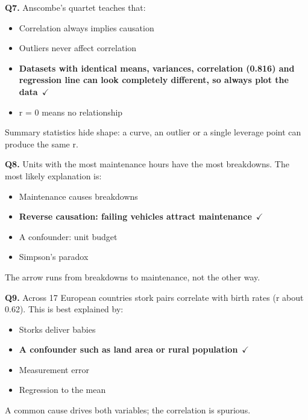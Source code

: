 \documentclass[11pt]{article}
\begin{document}
{\noindent\textbf{Q7.} Anscombe's quartet teaches that:\begin{itemize}[leftmargin=2.2em,itemsep=0pt,topsep=1pt]\item[A.] Correlation always implies causation\item[B.] Outliers never affect correlation\item[\textbf{C.}] \textbf{Datasets with identical means, variances, correlation (0.816) and regression line can look completely different, so always plot the data}~{\color{GrnN}$\checkmark$}\item[D.] r = 0 means no relationship\end{itemize} Summary statistics hide shape: a curve, an outlier or a single leverage point can produce the same r.\par\medskip

\noindent\textbf{Q8.} Units with the most maintenance hours have the most breakdowns. The most likely explanation is:\begin{itemize}[leftmargin=2.2em,itemsep=0pt,topsep=1pt]\item[A.] Maintenance causes breakdowns\item[\textbf{B.}] \textbf{Reverse causation: failing vehicles attract maintenance}~{\color{GrnN}$\checkmark$}\item[C.] A confounder: unit budget\item[D.] Simpson's paradox\end{itemize} The arrow runs from breakdowns to maintenance, not the other way.\par\medskip

\noindent\textbf{Q9.} Across 17 European countries stork pairs correlate with birth rates (r about 0.62). This is best explained by:\begin{itemize}[leftmargin=2.2em,itemsep=0pt,topsep=1pt]\item[A.] Storks deliver babies\item[\textbf{B.}] \textbf{A confounder such as land area or rural population}~{\color{GrnN}$\checkmark$}\item[C.] Measurement error\item[D.] Regression to the mean\end{itemize} A common cause drives both variables; the correlation is spurious.\par\medskip

}
\end{document}
